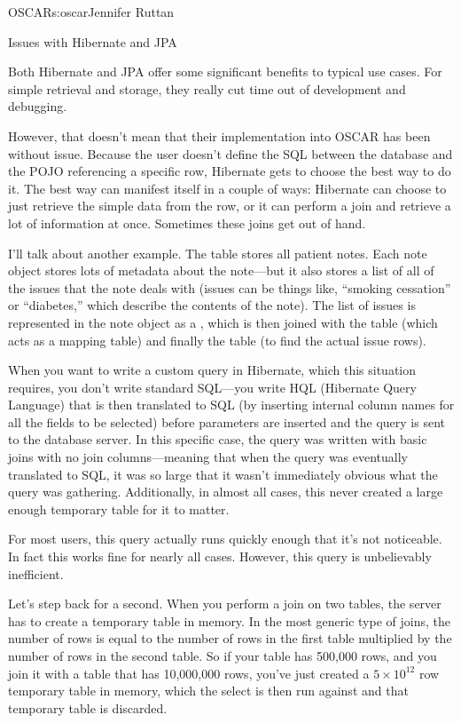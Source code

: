 \begin{aosachapter}{OSCAR}{s:oscar}{Jennifer Ruttan}
\begin{aosasect1}{Issues with Hibernate and JPA}

Both Hibernate and JPA offer some significant benefits to typical use
cases. For simple retrieval and storage, they really cut time out of
development and debugging.

However, that doesn't mean that their implementation into OSCAR has
been without issue. Because the user doesn't define the SQL between
the database and the POJO referencing a specific row, Hibernate gets
to choose the best way to do it. The best way can manifest itself in a
couple of ways: Hibernate can choose to just retrieve the simple data
from the row, or it can perform a join and retrieve a lot of
information at once. Sometimes these joins get out of hand.

I'll talk about another example. The  table
stores all patient notes. Each note object stores lots of metadata
about the note---but it also stores a list of all of the issues that
the note deals with (issues can be things like, ``smoking cessation''
or ``diabetes,'' which describe the contents of the note). The list of
issues is represented in the note object as a
, which is then
joined with the  table (which acts as a
mapping table) and finally the  table (to find
the actual issue rows).

When you want to write a custom query in Hibernate, which this
situation requires, you don't write standard SQL---you write HQL
(Hibernate Query Language) that is then translated to SQL (by
inserting internal column names for all the fields to be selected)
before parameters are inserted and the query is sent to the database
server. In this specific case, the query was written with basic joins
with no join columns---meaning that when the query was eventually
translated to SQL, it was so large that it wasn't immediately obvious
what the query was gathering. Additionally, in almost all cases, this
never created a large enough temporary table for it to matter.

For most users, this query actually runs quickly enough that it's not
noticeable. In fact this works fine for nearly all cases. However,
this query is unbelievably inefficient.

Let's step back for a second. When you perform a join on two tables,
the server has to create a temporary table in memory. In the most
generic type of joins, the number of rows is equal to the number of
rows in the first table multiplied by the number of rows in the second
table. So if your table has 500,000 rows, and you join it with a table
that has 10,000,000 rows, you've just created a $5{\times}10^{12}$ row
temporary table in memory, which the select is then run against and
that temporary table is discarded.


\end{aosasect1}
\end{aosachapter}
